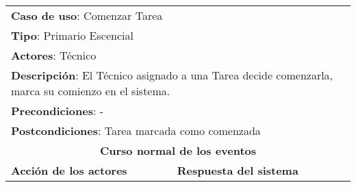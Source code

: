 \documentclass[12pt]{extarticle}
\begin{document}
    \newcommand\inc{\stepcounter{step}\textbf{\thestep. }}
    \newcommand\resetinc{\setcounter{step}{0}}
    \newcommand\raya{\noindent\rule{169mm}{0.8mm}\\}


	\begin{longtable}{ |p{8cm}|p{8cm}| }
		\hline
		\multicolumn{2}{|p{16cm}|}{\textbf{Caso de uso}: Comenzar Tarea}\\
		\multicolumn{2}{|p{16cm}|}{\textbf{Tipo}: Primario Escencial}\\
		\multicolumn{2}{|p{16cm}|}{\textbf{Actores}: Técnico}\\
		\multicolumn{2}{|p{16cm}|}{\textbf{Descripción}: El Técnico asignado a una Tarea decide comenzarla, marca su comienzo en el sistema.}\\
		\multicolumn{2}{|p{16cm}|}{\textbf{Precondiciones}: -}\\
		\multicolumn{2}{|p{16cm}|}{\textbf{Postcondiciones}: Tarea marcada como comenzada}\\
		\hline
		\multicolumn{2}{|c|}{\textbf{Curso normal de los eventos}}\\
		\hline
		\textbf{Acción de los actores} & \textbf{Respuesta del sistema}\\
		\hline


\end{longtable}
\end{document}
